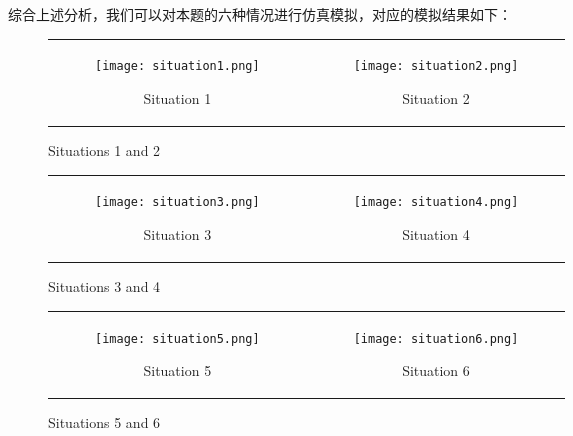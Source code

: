 \documentclass[utf8]{ctexart} %
\begin{document}
		
		综合上述分析，我们可以对本题的六种情况进行仿真模拟，对应的模拟结果如下：
		
		
		\begin{figure}[H]
			\centering
			\begin{tabular}{cc}
				\begin{subfigure}[b]{0.45\textwidth}
					\centering
					\texttt{[image: situation1.png]}
					\caption{Situation 1}
				\end{subfigure} &
				\begin{subfigure}[b]{0.45\textwidth}
					\centering
					\texttt{[image: situation2.png]}
					\caption{Situation 2}
				\end{subfigure} \\
			\end{tabular}
			\caption{Situations 1 and 2}
		\end{figure}
		
		\begin{figure}[H]
			\centering
			\begin{tabular}{cc}
				\begin{subfigure}[b]{0.45\textwidth}
					\centering
					\texttt{[image: situation3.png]}
					\caption{Situation 3}
				\end{subfigure} &
				\begin{subfigure}[b]{0.45\textwidth}
					\centering
					\texttt{[image: situation4.png]}
					\caption{Situation 4}
				\end{subfigure} \\
			\end{tabular}
			\caption{Situations 3 and 4}
		\end{figure}
		
		\begin{figure}[H]
			\centering
			\begin{tabular}{cc}
				\begin{subfigure}[b]{0.45\textwidth}
					\centering
					\texttt{[image: situation5.png]}
					\caption{Situation 5}
				\end{subfigure} &
				\begin{subfigure}[b]{0.45\textwidth}
					\centering
					\texttt{[image: situation6.png]}
					\caption{Situation 6}
				\end{subfigure} \\
			\end{tabular}
			\caption{Situations 5 and 6}
		\end{figure}
		
\end{document}
